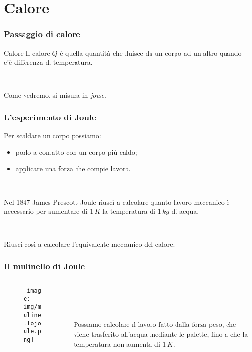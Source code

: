 \documentclass[]{beamer}
\theoremstyle{plain}
\begin{document}
\section{Calore}

\begin{frame}
\frametitle{Passaggio di calore}
\begin{block}{Calore}
Il calore $ Q $ è quella quantità che fluisce da un corpo ad un altro quando c'è differenza di temperatura.\pause

~

Come vedremo, si misura in \emph{joule}.
\end{block}
\end{frame}

\begin{frame}
\frametitle{L'esperimento di Joule}
Per scaldare un corpo possiamo:
\begin{itemize}
  \item porlo a contatto con un corpo più caldo;\pause
  \item applicare una forza che compie lavoro.\pause
\end{itemize}

~

Nel 1847 James Prescott Joule riuscì a calcolare quanto \alert<3>{lavoro meccanico} è necessario per aumentare di $ 1\, K $ la temperatura di $ 1 \, kg $ di acqua.\pause

~

Riuscì così a calcolare l'\alert<4>{equivalente meccanico del calore}.
\end{frame}

\begin{frame}
\frametitle{Il mulinello di Joule}

\begin{columns}
\begin{column}{0.5\textwidth}
\begin{figure}
\texttt{[image: img/mulinellojoule.png]}
\end{figure}
\end{column}
\begin{column}{0.4\textwidth}\pause

~

~


Possiamo calcolare il lavoro fatto dalla forza peso, che viene trasferito all'acqua mediante le palette, fino a che la temperatura non aumenta di $ 1 \, K $.
\end{column}
\end{columns}
\end{frame}
\end{document}
